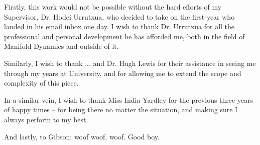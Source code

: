 Firstly, this work would not be possible without the hard efforts of my Supervisor, Dr. Hodei Urrutxua, who decided to take on the first-year who landed in his email inbox one day. I wish to thank Dr. Urrutxua for all the professional and personal development he has afforded me, both in the field of Manifold Dynamics and outside of it.

Similarly, I wish to thank ... and Dr. Hugh Lewis for their assistance in seeing me through my years at University, and for allowing me to extend the scope and complexity of this piece.

In a similar vein, I wish to thank Miss India Yardley for the previous three years of happy times -- for being there no matter the situation, and making sure I always perform to my best.

And lastly, to Gibson: woof woof, woof. Good boy.
